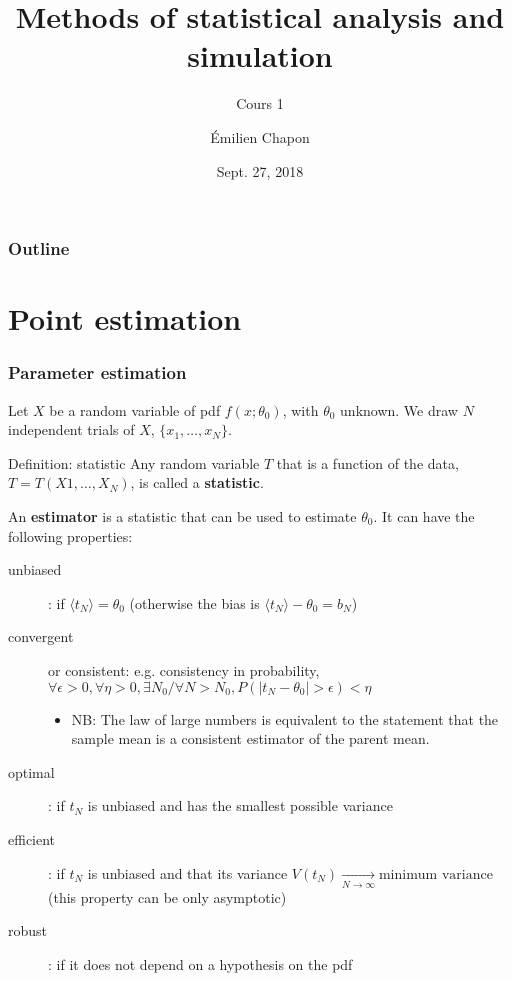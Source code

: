 \documentclass[9pt]{beamer}
\date[Stat2]{Sept. 27, 2018}
\title{Methods of statistical analysis and simulation}
\subtitle{Cours 1}
\author[E. Chapon]{Émilien Chapon}
\begin{document}
{

\begin{frame}
 \maketitle
 
\end{frame}
}

\begin{frame}
 \frametitle{Outline}
 
 \tableofcontents
\end{frame}

\section{Point estimation}

\begin{frame}
 \frametitle{Parameter estimation}
 
 Let $X$ be a random variable of pdf $f(x;\theta_0)$, with $\theta_0$ unknown. We draw $N$ independent trials of $X$, $\{x_1,\dots,x_N\}$.
 
 \begin{block}{Definition: statistic}
  Any random variable $T$ that is a function of the data, $T = T(X1,\dots,X_N)$, is called a \textbf{statistic}.
 \end{block}
 
 An \textbf{estimator} is a statistic that can be used to estimate $\theta_0$. It can have the following properties:
 
 \begin{description}
  \item[unbiased]: if $\langle t_N \rangle = \theta_0$ (otherwise the bias is $\langle t_N \rangle - \theta_0 = b_N$)
  \item[convergent] or consistent: e.g. consistency in probability, $\forall \epsilon>0, \forall \eta>0, \exists N_0 / \forall N>N_0, P(|t_N - \theta_0|>\epsilon)<\eta$
  \begin{itemize}
   \item NB: The law of large numbers is equivalent to the statement that the sample mean is a consistent estimator of the parent mean.
  \end{itemize}
  \item[optimal]: if $t_N$ is unbiased and has the smallest possible variance
  \item[efficient]: if $t_N$ is unbiased and that its variance $V(t_N) \xrightarrow[N\to\infty]{} \text{minimum variance}$ (this property can be only asymptotic)
  \item[robust]: if it does not depend on a hypothesis on the pdf
 \end{description}

\end{frame}
\end{document}
